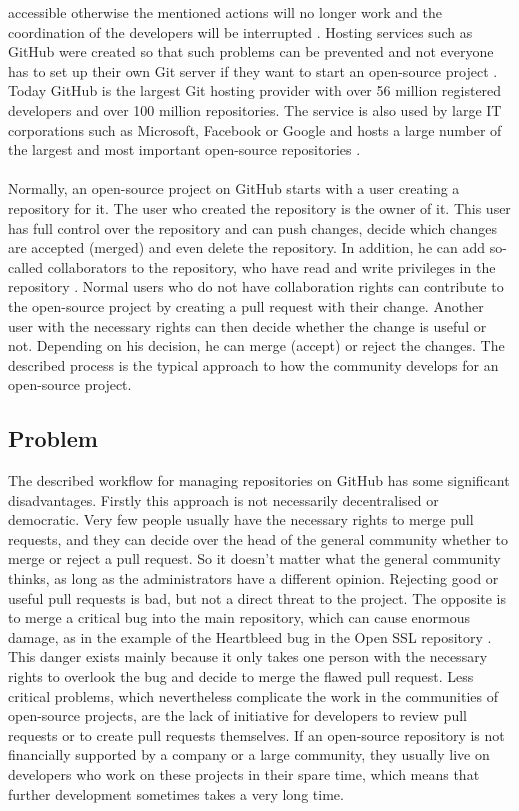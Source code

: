 \documentclass[sigconf]{acmart}
\begin{document}
accessible otherwise the mentioned actions will no longer work and the coordination of the developers will be
interrupted \cite{ulrich2020dev}. Hosting services such as GitHub were created so that such problems can be prevented 
and not everyone has to set up their own Git server if they want to start an open-source project \cite{ulrich2020dev, git2021hub}.
Today GitHub is the largest Git hosting provider with over 56 million registered developers and over 100 million repositories.
\cite{git2021hub} The service is also used by large IT corporations such as Microsoft, Facebook or Google and hosts a large 
number of the largest and most important open-source repositories \cite{git2021stars}.\\ \\
Normally, an open-source project on GitHub starts with a user creating a repository for it. The user who created the 
repository is the owner of it. This user has full control over the repository and can push changes, decide which changes are 
accepted (merged) and even delete the repository. In addition, he can add so-called collaborators to the repository, who have 
read and write privileges in the repository \cite{git2021rights}. Normal users who do not have collaboration rights can contribute to 
the open-source project by creating a pull request with their change. Another user with the necessary rights can then decide 
whether the change is useful or not. Depending on his decision, he can merge (accept) or reject the changes. 
The described process is the typical approach to how the community develops for an open-source project.


\subsection{Problem}
The described workflow for managing repositories on GitHub has some significant disadvantages. 
Firstly this approach is not necessarily decentralised or democratic. Very few people usually have 
the necessary rights to merge pull requests, and they can decide over the head of the general community whether to merge or reject
 a pull request. So it doesn't matter what the general community thinks, as long as the administrators have a different opinion. Rejecting
 good or useful pull requests is bad, but not a direct threat to the project. The opposite is to merge a critical bug into the main repository,
 which can cause enormous damage, as in the example of the Heartbleed bug in the Open SSL repository \cite{ioriheartbleed}. This 
danger exists mainly because it only takes one person with the necessary rights to overlook the bug and decide to merge the flawed 
pull request. Less critical problems, which nevertheless complicate the work in the communities of open-source projects, are the lack
 of initiative for developers to review pull requests or to create pull requests themselves. If an open-source repository is not financially
 supported by a company or a large community, they usually live on developers who work on these projects in their spare time, which 
means that further development sometimes takes a very long time. 
\end{document}
